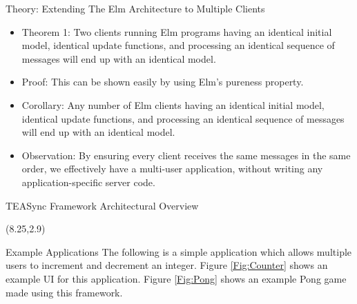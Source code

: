 \documentclass[22pt]{beamer}
\begin{document}
\begin{frame}[fragile]
\begin{textblock}{7.25}
        \begin{block}{\fontsize{37}{20}\selectfont Theory: Extending The Elm Architecture to Multiple Clients}
            \begin{itemize}
                \item Theorem 1: Two clients running Elm programs having an identical initial model,
                      identical update functions, and processing an identical sequence of messages will end up
                      with an identical model.
                \item Proof: This can be shown easily by using Elm's pureness property.
                \item Corollary: Any number of Elm clients having an identical initial model,
                      identical update functions, and processing an identical sequence of messages will end up
                      with an identical model.
                \item Observation: By ensuring every client receives the same messages in the same order,
                      we effectively have a multi-user application, without writing any application-specific server
                      code.
            \end{itemize}
        \end{block}

        \begin{block}{\fontsize{37}{20}\selectfont TEASync Framework Architectural Overview}
            \vspace{-6mm}
        \end{block}
    \end{textblock}

    \begin{textblock}{7.25}(8.25,2.9)
        \begin{block}{\fontsize{37}{20}\selectfont Example Applications}
            The following is a simple application which allows multiple users to increment and decrement an
            integer. Figure \ref{Fig:Counter} shows an example UI for this application. Figure \ref{Fig:Pong} shows an example Pong game made using this framework.


\end{block}
\end{textblock}
\end{frame}
\end{document}
